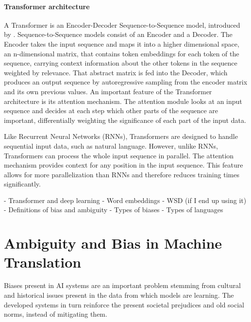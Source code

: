 \paragraph{Transformer architecture} 
A Transformer is an Encoder-Decoder Sequence-to-Sequence model, introduced by \cite{transformer}. Sequence-to-Sequence models consist of an Encoder and a Decoder. The Encoder takes the input sequence and maps it into a higher dimensional space, an n-dimensional matrix, that contains token embeddings for each token of the sequence, carrying context information about the other tokens in the sequence weighted by relevance. That abstract matrix is fed into the Decoder, which produces an output sequence by autoregressive sampling from the encoder matrix and its own previous values. An important feature of the Transformer architecture is its attention mechanism. The attention module looks at an input sequence and decides at each step which other parts of the sequence are important, differentially weighting the significance of each part of the input data. 

Like Recurrent Neural Networks (RNNs), Transformers are designed to handle sequential input data, such as natural language. However, unlike RNNs, Transformers can process the whole input sequence in parallel. The attention mechanism provides context for any position in the input sequence. This feature allows for more parallelization than RNNs and therefore reduces training times significantly.

- Transformer and deep learning
- Word embeddings
- WSD (if I end up using it)
- Definitions of bias and  ambiguity
- Types of biases
- Types of languages

\section{Ambiguity and Bias in Machine Translation}
\label{sec:Background:Ambiguity_Bias}

Biases present in AI systems are an important problem stemming from cultural and historical issues present in the data from which models are learning. The developed systems in turn reinforce the present societal prejudices and old social norms, instead of mitigating them.




